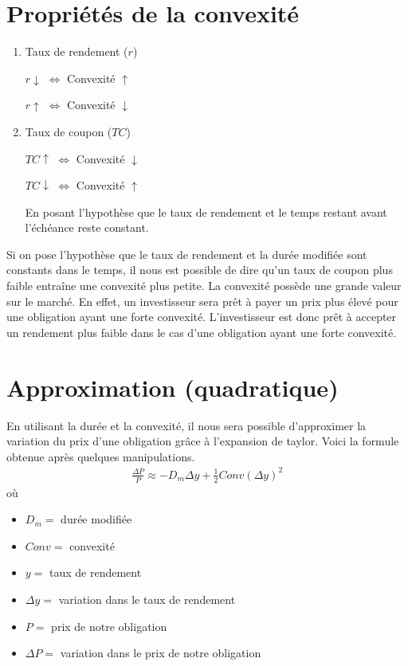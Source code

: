 \documentclass[letterpaper, 12pt]{article}
\newcommand{\1}{\mathds{1}}	%
\theoremstyle{definition}
\begin{document}
\section{Propriétés de la convexité}
\begin{enumerate}
\item Taux de rendement ($r$)
\begin{center}
$r \downarrow$ \hspace{1cm} $\Longleftrightarrow$  \hspace{1cm} Convexité $\uparrow$
\end{center}
\begin{center}
$r \uparrow$ \hspace{1cm} $\Longleftrightarrow$  \hspace{1cm} Convexité $\downarrow$
\end{center}
\item Taux de coupon ($TC$)
\begin{center}
$TC \uparrow$ \hspace{1cm} $\Longleftrightarrow$  \hspace{1cm} Convexité $\downarrow$
\end{center}
\begin{center}
$TC \downarrow$ \hspace{1cm} $\Longleftrightarrow$  \hspace{1cm} Convexité $\uparrow$
\end{center}
En posant l'hypothèse que le taux de rendement et le temps restant avant l'échéance reste constant.
\end{enumerate}
Si on pose l'hypothèse que le taux de rendement et la durée modifiée sont constants dans le temps,  il nous est possible de dire qu'un taux de coupon plus faible entraîne une convexité plus petite.  La convexité possède une grande valeur sur le marché. En effet,  un investisseur sera prêt à payer un prix plus élevé pour une obligation ayant une forte convexité.  L'investisseur est donc prêt à accepter un rendement plus faible dans le cas d'une obligation ayant une forte convexité.

\section{Approximation (quadratique)}
En utilisant la durée et la convexité,  il nous sera possible d'approximer la variation du prix d'une obligation grâce à l'expansion de taylor.  Voici la formule obtenue après quelques manipulations.
\begin{align*}
\frac{\Delta P}{P} \approx -D_m \Delta y +\frac{1}{2} Conv(\Delta y)^2
\end{align*}
où 
\begin{itemize}
\item $D_m=$ durée modifiée 
\item $Conv=$ convexité
\item $y=$ taux de rendement 
\item $\Delta y=$ variation dans le taux de rendement 
\item $P=$ prix de notre obligation 
\item $\Delta P=$ variation dans le prix de notre obligation 
\end{itemize}
\end{document}
